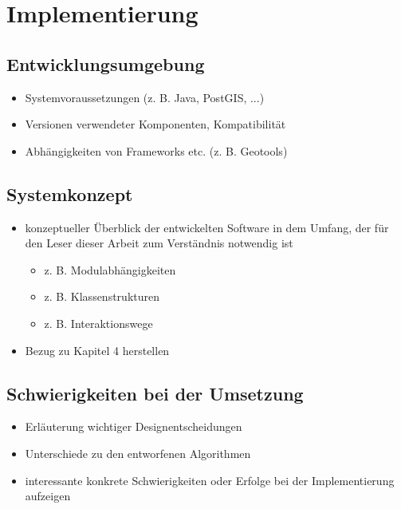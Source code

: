 \documentclass[../main/thesis.tex]{subfiles}
\begin{document}
\chapter{Implementierung}

\section{Entwicklungsumgebung}

\begin{itemize}
	\item Systemvoraussetzungen (z. B. Java, PostGIS, ...)
	\item Versionen verwendeter Komponenten, Kompatibilität
	\item Abhängigkeiten von Frameworks etc. (z. B. Geotools)
\end{itemize}



\section{Systemkonzept}

\begin{itemize}
	\item konzeptueller Überblick der entwickelten Software in dem Umfang, der für den Leser dieser Arbeit zum Verständnis notwendig ist
	\begin{itemize}
		\item z. B. Modulabhängigkeiten
		\item z. B. Klassenstrukturen
		\item z. B. Interaktionswege
	\end{itemize}
	\item Bezug zu Kapitel 4 herstellen
\end{itemize}



\section{Schwierigkeiten bei der Umsetzung}

\begin{itemize}
	\item Erläuterung wichtiger Designentscheidungen
	\item Unterschiede zu den entworfenen Algorithmen
	\item interessante konkrete Schwierigkeiten oder Erfolge bei der Implementierung aufzeigen
\end{itemize}


\end{document}

